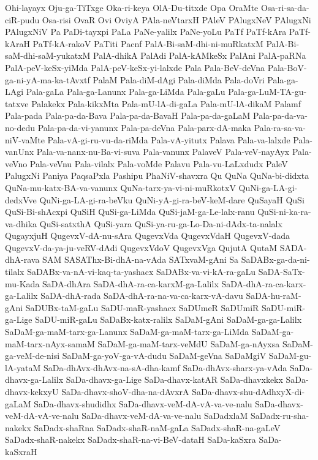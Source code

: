 {Ohi-layayx
Oju-ga-TiTxge
Oka-ri-keya
OlA-Du-titxde
Opa
OraMte
Osa-ri-sa-da-ciR-pudu
Osa-risi
OvaR
Ovi
OviyA
PAla-neVtarxH
PAleV
PAlugxNeV
PAlugxNi
PAlugxNiV
Pa
PaDi-tayxpi
PaLa
PaNe-yalilx
PaNe-yoLu
PaTf
PaTf-kAra
PaTf-kAraH
PaTf-kA-rakoV
PaTiti
Pacnf
PalA-Bi-saM-dhi-ni-muRkatxM
PalA-Bi-saM-dhi-saM-yukatxM
PalA-dhikA
PalAdi
PalA-kAMkeSx
PalAni
PalA-paRNa
PalA-peV-keSx-yiMda
PalA-peV-keSx-yi-lalxde
Pala
Pala-BeV-deVna
Pala-BoV-ga-ni-yA-ma-ka-tAvxtf
PalaM
Pala-diM-dAgi
Pala-diMda
Pala-doVri
Pala-ga-LAgi
Pala-gaLa
Pala-ga-Lanunx
Pala-ga-LiMda
Pala-gaLu
Pala-ga-LuM-TA-gu-tatxve
Palakekx
Pala-kikxMta
Pala-mU-lA-di-gaLa
Pala-mU-lA-dikaM
Palamf
Pala-pada
Pala-pa-da-Bava
Pala-pa-da-BavaH
Pala-pa-da-gaLaM
Pala-pa-da-va-no-dedu
Pala-pa-da-vi-yanunx
Pala-pa-deVna
Pala-parx-dA-maka
Pala-ra-sa-va-niV-vaMte
Pala-vA-gi-ru-vu-da-riMda
Pala-vA-yitutx
Palava
Pala-va-lalxde
Pala-vanUnx
Pala-va-nanx-nu-Ba-vi-suva
Pala-vanunx
PalaveV
Pala-veV-nayAyx
Pala-veVno
Pala-veVnu
Pala-vilalx
Pala-voMde
Palavu
Pala-vu-LaLxdudx
PaleV
PalugxNi
Paniya
PaqsaPxla
Pashipu
PhaNiV-shavxra
Qu
QuNa
QuNa-bi-didxta
QuNa-mu-katx-BA-va-vanunx
QuNa-tarx-ya-vi-ni-muRkotxV
QuNi-ga-LA-gi-dedxVve
QuNi-ga-LA-gi-ra-beVku
QuNi-yA-gi-ra-beV-keM-dare
QuSayaH
QuSi
QuSi-Bi-shAcxpi
QuSiH
QuSi-ga-LiMda
QuSi-jaM-ga-Le-lalx-ranu
QuSi-ni-ka-ra-va-dhika
QuSi-satxthA
QuSi-yara
QuSi-ya-ru-ga-Lo-Da-ni-dAdx-ta-nalalx
QugayxjuH
QugevxV-dA-nu-sAra
QugevxVda
QugevxVdaH
QugevxV-dada
QugevxV-da-ya-ju-veRV-dAdi
QugevxVdoV
QugevxVga
QujutA
QutaM
SADA-dhA-rava
SAM
SASAThx-Bi-dhA-na-vAda
SATxvaM-gAni
Sa
SaDABx-ga-da-ni-tilalx
SaDABx-va-nA-vi-kaq-ta-yashacx
SaDABx-va-vi-kA-ra-gaLu
SaDA-SaTx-mu-Kada
SaDA-dhAra
SaDA-dhA-ra-ca-karxM-ga-Lalilx
SaDA-dhA-ra-ca-karx-ga-Lalilx
SaDA-dhA-rada
SaDA-dhA-ra-na-va-ca-karx-vA-davu
SaDA-hu-raM-gAni
SaDUBx-taM-gaLu
SaDU-maR-yashacx
SaDUmeR
SaDUmiR
SaDU-miR-ga-Lige
SaDU-miR-gaLu
SaDaBx-katx-ralilx
SaDaM-gAni
SaDaM-ga-ga-Lalilx
SaDaM-ga-maM-tarx-ga-Lanunx
SaDaM-ga-maM-tarx-ga-LiMda
SaDaM-ga-maM-tarx-nAyx-samaM
SaDaM-ga-maM-tarx-veMdU
SaDaM-ga-nAyxsa
SaDaM-ga-veM-de-nisi
SaDaM-ga-yoV-ga-vA-dudu
SaDaM-geVna
SaDaMgiV
SaDaM-gu-lA-yataM
SaDa-dhAvx-dhAvx-na-sA-dha-kamf
SaDa-dhAvx-sharx-ya-vAda
SaDa-dhavx-ga-Lalilx
SaDa-dhavx-ga-Lige
SaDa-dhavx-katAR
SaDa-dhavxkekx
SaDa-dhavx-kekxyU
SaDa-dhavx-shoV-dha-na-dAvxrA
SaDa-dhavx-shu-dAdhxyX-di-gaLaM
SaDa-dhavx-shudidhx
SaDa-dhavx-veM-dA-vA-va-ve-nalu
SaDa-dhavx-veM-dA-vA-ve-nalu
SaDa-dhavx-veM-dA-va-ve-nalu
SaDadxlaM
SaDadx-ru-sha-nakekx
SaDadx-shaRna
SaDadx-shaR-naM-gaLa
SaDadx-shaR-na-gaLeV
SaDadx-shaR-nakekx
SaDadx-shaR-na-vi-BeV-dataH
SaDa-kaSxra
SaDa-kaSxraH
}
